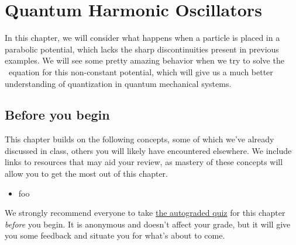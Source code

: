 

%

\chapter{Quantum Harmonic Oscillators} \label{ch:qho}
In this chapter, we will consider what happens when a particle is placed in a parabolic potential, which lacks the sharp discontinuities present in previous examples. 
We will see some pretty amazing behavior when we try to solve the \Sch\ equation for this non-constant potential, which will give us a much better understanding of quantization in quantum mechanical systems.


\section{Before you begin}

This chapter builds on the following concepts, some of which we've already discussed in class, others you will likely have encountered elsewhere.
We include links to resources that may aid your review, as mastery of these concepts will allow you to get the most out of this chapter.

\begin{itemize}
	\item foo
\end{itemize}

\begin{tcolorbox}[colframe=PaloAlto, colbacktitle=PaloAlto!20!white, title=Pre-check quiz]
	We strongly recommend everyone to take \href{TODO}{the autograded quiz} for this chapter \emph{before} you begin.
	It is anonymous and doesn't affect your grade, but it will give you some feedback and situate you for what's about to come.
\end{tcolorbox}



